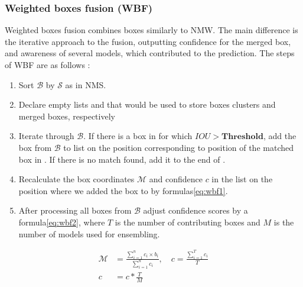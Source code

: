 \subsubsection{Weighted boxes fusion (WBF)}
Weighted boxes fusion combines boxes similarly to NMW. The main difference is the iterative approach to the fusion, outputting confidence for the merged box, and awareness of several models, which contributed to the prediction.
The steps of WBF are as follows \cite{Solovyev2019}:
\begin{enumerate}
    \item Sort $\mathcal{B}$ by $\mathcal{S}$ as in NMS.
    \item Declare empty lists  and  that would be used to store boxes clusters and merged boxes, respectively
    \item Iterate through $\mathcal{B}$. If there is a box in  for which $IOU > \mathbf{Threshold}$, add the box from $\mathcal{B}$ to list  on the position corresponding to position of the matched box in . If there is no match  found, add it to the end of .
    \item Recalculate the box coordinates $\mathcal{M}$ and confidence $c$ in the list  on the position where we added the box to  by formulas\ref{eq:wbf1}.
    \item After processing all boxes from $\mathcal{B}$ adjust confidence scores by a formula\ref{eq:wbf2}, where $T$ is the number of contributing boxes and $M$ is the number of models used for ensembling.
\end{enumerate}
\begin{align}
    \mathcal{M} & = \frac{\sum_{i=1}^n c_i \times b_i}{\sum_{i=1}^n c_i} ,\quad c=\frac{\sum_{i=1}^{T}c_i}{T} \label{eq:wbf1} \\
    c           & = c * \frac{T}{M} \label{eq:wbf2}
\end{align}
